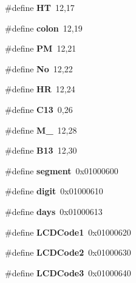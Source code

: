 \begin{DoxyCompactItemize}
\#define {\bfseries HT}~12,17
\item 
\mbox{\label{a00017_a36ef1f5fe1063a419df50064323e2cc0}} 
\#define {\bfseries colon}~12,19
\item 
\mbox{\label{a00017_a23c7d58108d99a089ce0824823e6b950}} 
\#define {\bfseries PM}~12,21
\item 
\mbox{\label{a00017_a554d6ecb4ae62985018db18be458114d}} 
\#define {\bfseries No}~12,22
\item 
\mbox{\label{a00017_a9f4fe887f0a8d76a310f6539ebbae763}} 
\#define {\bfseries HR}~12,24
\item 
\mbox{\label{a00017_ab6f4f9f1b1c6a920c431f354902666c6}} 
\#define {\bfseries C13}~0,26
\item 
\mbox{\label{a00017_a86bfbeb01373c00bd9c2e143c09b16f8}} 
\#define {\bfseries M\+\_}~12,28
\item 
\mbox{\label{a00017_aef7d45f9e79018036f51ffedbec2cfed}} 
\#define {\bfseries B13}~12,30
\item 
\mbox{\label{a00017_a7f9db4ccade13b8f44bb9126aaf6e61b}} 
\#define {\bfseries segment}~0x01000600
\item 
\mbox{\label{a00017_a5e1b779633b01e65f3003b3803dc5b09}} 
\#define {\bfseries digit}~0x01000610
\item 
\mbox{\label{a00017_a8e2a6b361a1605c62ebffa2173acece0}} 
\#define {\bfseries days}~0x01000613
\item 
\mbox{\label{a00017_ac2b993920e42dea2d782dcce0cba42be}} 
\#define {\bfseries L\+C\+D\+Code1}~0x01000620
\item 
\mbox{\label{a00017_a4a1ce4157ef46df6a22a3d93cc77b089}} 
\#define {\bfseries L\+C\+D\+Code2}~0x01000630
\item 
\mbox{\label{a00017_ab3f01b9f6d297d173c99f7a12560a1ae}} 
\#define {\bfseries L\+C\+D\+Code3}~0x01000640
\item 

\end{DoxyCompactItemize}
